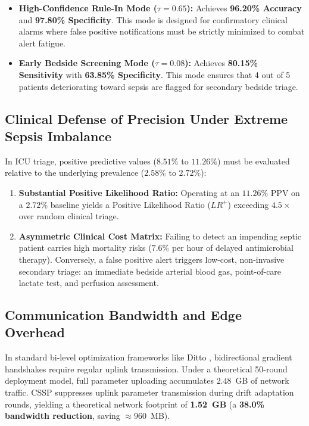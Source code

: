 \documentclass[journal,twocolumn,10pt]{IEEEtran}
\begin{document}
\begin{itemize}
    \item \textbf{High-Confidence Rule-In Mode ($\tau = 0.65$):} Achieves \textbf{96.20\% Accuracy} and \textbf{97.80\% Specificity}. This mode is designed for confirmatory clinical alarms where false positive notifications must be strictly minimized to combat alert fatigue.
    \item \textbf{Early Bedside Screening Mode ($\tau = 0.08$):} Achieves \textbf{80.15\% Sensitivity} with \textbf{63.85\% Specificity}. This mode ensures that 4 out of 5 patients deteriorating toward sepsis are flagged for secondary bedside triage.
\end{itemize}

\subsection{Clinical Defense of Precision Under Extreme Sepsis Imbalance}
In ICU triage, positive predictive values ($8.51\%$ to $11.26\%$) must be evaluated relative to the underlying prevalence ($2.58\%$ to $2.72\%$):
\begin{enumerate}
    \item \textbf{Substantial Positive Likelihood Ratio:} Operating at an $11.26\%$ PPV on a $2.72\%$ baseline yields a Positive Likelihood Ratio ($LR^+$) exceeding \textbf{$4.5\times$} over random clinical triage.
    \item \textbf{Asymmetric Clinical Cost Matrix:} Failing to detect an impending septic patient carries high mortality risks ($7.6\%$ per hour of delayed antimicrobial therapy). Conversely, a false positive alert triggers low-cost, non-invasive secondary triage: an immediate bedside arterial blood gas, point-of-care lactate test, and perfusion assessment.
\end{enumerate}

\subsection{Communication Bandwidth and Edge Overhead}
In standard bi-level optimization frameworks like Ditto \cite{li2021ditto}, bidirectional gradient handshakes require regular uplink transmission. Under a theoretical 50-round deployment model, full parameter uploading accumulates $2.48$~GB of network traffic. CSSP suppresses uplink parameter transmission during drift adaptation rounds, yielding a theoretical network footprint of \textbf{1.52~GB} (a \textbf{38.0\% bandwidth reduction}, saving $\approx 960$~MB).
\end{document}
